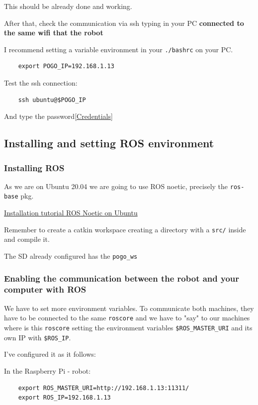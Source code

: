 \documentclass{article}
\begin{document}
This should be already done and working.

After that, check the communication via ssh typing in your PC \textbf{connected to the same wifi that the robot}

I recommend setting a variable environment in your \verb|./bashrc| on your PC.
\begin{verbatim}
    export POGO_IP=192.168.1.13
\end{verbatim}

Test the ssh connection:

\begin{verbatim}
    ssh ubuntu@$POGO_IP
\end{verbatim}

And type the password\ref{Credentials}

\subsection{Installing and setting ROS environment}

\subsubsection{Installing ROS}
As we are on Ubuntu 20.04 we are going to use ROS noetic, precisely the \verb|ros-base| pkg.

\href{http://wiki.ros.org/noetic/Installation/Ubuntu}{Installation tutorial ROS Noetic on Ubuntu}

Remember to create a catkin workspace creating a directory with a \verb|src/| inside and compile it.

The SD already configured has the \verb|pogo_ws|

\subsubsection{Enabling the communication between the robot and your computer with ROS}

We have to set more environment variables. To communicate both machines, they have to be connected to the same \verb|roscore| and we have to "say" to our machines where is this \verb|roscore| setting the environment variables \verb|$ROS_MASTER_URI| and its own IP with \verb|$ROS_IP|.

I've configured it as it follows:

In the Raspberry Pi - robot:

\begin{verbatim}
    export ROS_MASTER_URI=http://192.168.1.13:11311/
    export ROS_IP=192.168.1.13
\end{verbatim}
\end{document}
